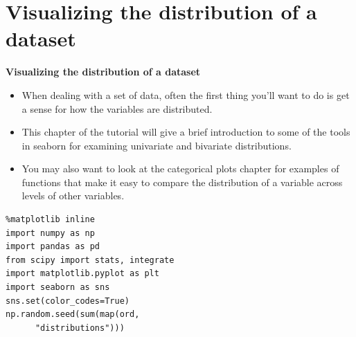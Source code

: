 \documentclass{beamer}
\begin{document}
\section{Visualizing the distribution of a dataset}
\begin{frame}
	\Large
	\noindent \textbf{Visualizing the distribution of a dataset}
	\begin{itemize}
\item When dealing with a set of data, often the first thing you’ll want to do is get a sense for how the variables are distributed.
\item  This chapter of the tutorial will give a brief introduction to some of the tools in seaborn for examining univariate and bivariate distributions. 
\item You may also want to look at the categorical plots chapter for examples of functions that make it easy to compare the distribution of a variable across levels of other variables.
	\end{itemize}

\end{frame}
\begin{frame}[fragile]
\Large\begin{framed}
\begin{verbatim}
%matplotlib inline
import numpy as np
import pandas as pd
from scipy import stats, integrate
import matplotlib.pyplot as plt
import seaborn as sns
sns.set(color_codes=True)
np.random.seed(sum(map(ord, 
      "distributions")))
\end{verbatim}
\end{framed}
\end{frame}
\end{document}
